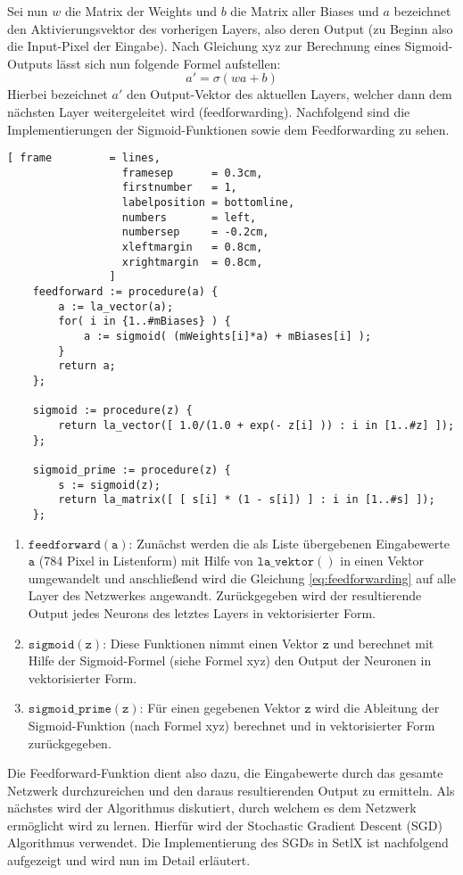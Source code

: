 \noindent
Sei nun $w$ die Matrix der Weights und $b$ die Matrix aller Biases und $a$ bezeichnet den Aktivierungsvektor des vorherigen Layers, also deren Output (zu Beginn also die Input-Pixel der Eingabe). Nach Gleichung xyz zur Berechnung eines Sigmoid-Outputs lässt sich nun folgende Formel aufstellen: 
\begin{equation}\label{eq:feedforwarding}
	a' = \sigma(wa + b)
\end{equation}
\noindent
Hierbei bezeichnet $a'$ den Output-Vektor des aktuellen Layers, welcher dann dem nächsten Layer weitergeleitet wird (feedforwarding). Nachfolgend sind die Implementierungen der Sigmoid-Funktionen sowie dem Feedforwarding zu sehen.
\begin{Verbatim}[ frame         = lines, 
                  framesep      = 0.3cm, 
                  firstnumber   = 1,
                  labelposition = bottomline,
                  numbers       = left,
                  numbersep     = -0.2cm,
                  xleftmargin   = 0.8cm,
                  xrightmargin  = 0.8cm,
                ]
	feedforward := procedure(a) {
		a := la_vector(a);	
		for( i in {1..#mBiases} ) { 
			a := sigmoid( (mWeights[i]*a) + mBiases[i] );
		}
		return a;
	};                
                
	sigmoid := procedure(z) {
		return la_vector([ 1.0/(1.0 + exp(- z[i] )) : i in [1..#z] ]);
	};

	sigmoid_prime := procedure(z) {
		s := sigmoid(z); 
		return la_matrix([ [ s[i] * (1 - s[i]) ] : i in [1..#s] ]);
	};
\end{Verbatim}
\begin{enumerate}
\item $\mathtt{feedforward(a)}$: Zunächst werden die als Liste übergebenen Eingabewerte $\mathtt{a}$ (784 Pixel in Listenform) mit Hilfe von $\mathtt{la\_vektor()}$ in einen Vektor umgewandelt und anschließend wird die Gleichung \eqref{eq:feedforwarding} auf alle Layer des Netzwerkes angewandt. Zurückgegeben wird der resultierende Output jedes Neurons des letztes Layers in vektorisierter Form.
\item $\mathtt{sigmoid(z)}$: Diese Funktionen nimmt einen Vektor $\mathtt{z}$ und berechnet mit Hilfe der Sigmoid-Formel (siehe Formel xyz) den Output der Neuronen in vektorisierter Form.
\item $\mathtt{sigmoid\_prime(z)}$: Für einen gegebenen Vektor $\mathtt{z}$ wird die Ableitung der Sigmoid-Funktion (nach Formel xyz) berechnet und in vektorisierter Form zurückgegeben.
\end{enumerate}
\noindent
Die Feedforward-Funktion dient also dazu, die Eingabewerte durch das gesamte Netzwerk durchzureichen und den daraus resultierenden Output zu ermitteln. Als nächstes wird der Algorithmus diskutiert, durch welchem es dem Netzwerk ermöglicht wird zu \glqq lernen\grqq. Hierfür wird der Stochastic Gradient Descent (SGD) Algorithmus verwendet. Die Implementierung des SGDs in SetlX ist nachfolgend aufgezeigt und wird nun im Detail erläutert.

